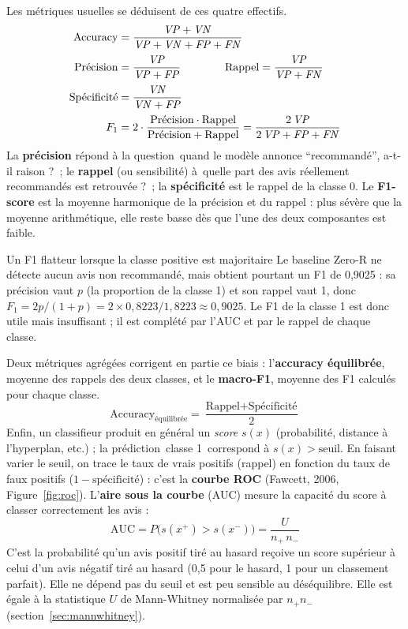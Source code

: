 \documentclass[11pt,a4paper]{report}
\def\og{\guillemotleft\nobreak\,}%
\def\fg{\unskip\nobreak\,\guillemotright}%
\newcommand{\gl}[1]{\og #1\fg{}}       %
\numberwithin{equation}{chapter}
\begin{document}
Les métriques usuelles se déduisent de ces quatre effectifs.
\begin{align}
\mathrm{Accuracy} &= \frac{\mathit{VP} + \mathit{VN}}{\mathit{VP} + \mathit{VN} + \mathit{FP} + \mathit{FN}} \label{eq:acc}\\[2pt]
\text{Précision} &= \frac{\mathit{VP}}{\mathit{VP} + \mathit{FP}} \qquad\qquad \text{Rappel} = \frac{\mathit{VP}}{\mathit{VP} + \mathit{FN}} \label{eq:pr}\\[2pt]
\text{Spécificité} &= \frac{\mathit{VN}}{\mathit{VN} + \mathit{FP}} \label{eq:spec}\\[2pt]
F_1 &= 2\cdot\frac{\text{Précision}\cdot\text{Rappel}}{\text{Précision}+\text{Rappel}} = \frac{2\,\mathit{VP}}{2\,\mathit{VP} + \mathit{FP} + \mathit{FN}} \label{eq:f1}
\end{align}
La \textbf{précision} répond à la question \gl{quand le modèle annonce “recommandé”, a-t-il raison ?} ; le \textbf{rappel} (ou sensibilité) à \gl{quelle part des avis réellement recommandés est retrouvée ?} ; la \textbf{spécificité} est le rappel de la classe 0. Le \textbf{F1-score} est la moyenne harmonique de la précision et du rappel : plus sévère que la moyenne arithmétique, elle reste basse dès que l'une des deux composantes est faible.

\begin{calloutpink}{Un F1 flatteur lorsque la classe positive est majoritaire}
Le baseline Zero-R ne détecte aucun avis non recommandé, mais obtient pourtant un F1 de 0,9025 : sa précision vaut $p$ (la proportion de la classe 1) et son rappel vaut 1, donc $F_1 = 2p/(1 + p) = 2 \times 0{,}8223 / 1{,}8223 \approx 0{,}9025$. Le F1 de la classe 1 est donc utile mais insuffisant ; il est complété par l'AUC et par le rappel de chaque classe.
\end{calloutpink}

Deux métriques agrégées corrigent en partie ce biais : l'\textbf{accuracy équilibrée}, moyenne des rappels des deux classes, et le \textbf{macro-F1}, moyenne des F1 calculés pour chaque classe.
\begin{equation}\label{eq:bacc}
\mathrm{Accuracy}_{\text{équilibrée}} = \frac{\text{Rappel} + \text{Spécificité}}{2}
\end{equation}
Enfin, un classifieur produit en général un \textit{score} $s(x)$ (probabilité, distance à l'hyperplan, etc.) ; la prédiction \gl{classe 1} correspond à $s(x) > \text{seuil}$. En faisant varier le seuil, on trace le taux de vrais positifs (rappel) en fonction du taux de faux positifs ($1 - \text{spécificité}$) : c'est la \textbf{courbe ROC} (Fawcett, 2006, Figure~\ref{fig:roc}). L'\textbf{aire sous la courbe} (AUC) mesure la capacité du score à classer correctement les avis :
\begin{equation}\label{eq:auc}
\mathrm{AUC} = P\bigl(s(x^{+}) > s(x^{-})\bigr) = \frac{U}{n_{+}\,n_{-}}
\end{equation}
C'est la probabilité qu'un avis positif tiré au hasard reçoive un score supérieur à celui d'un avis négatif tiré au hasard (0,5 pour le hasard, 1 pour un classement parfait). Elle ne dépend pas du seuil et est peu sensible au déséquilibre. Elle est égale à la statistique $U$ de Mann-Whitney normalisée par $n_{+}n_{-}$ (section~\ref{sec:mannwhitney}).
\end{document}
